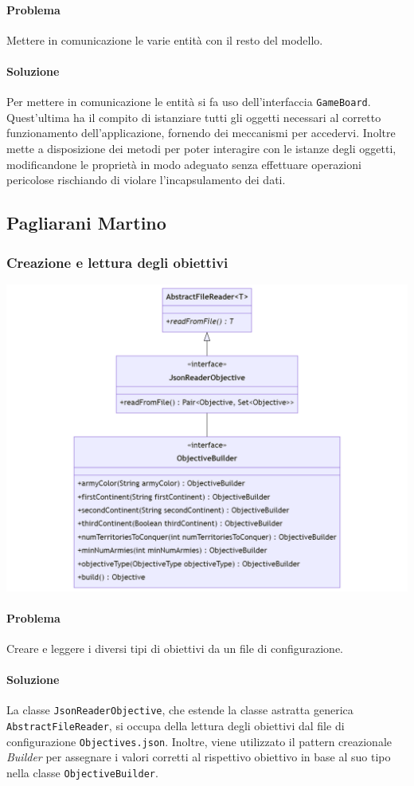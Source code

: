 \documentclass[a4paper,12pt]{report}
\begin{document}
\paragraph{Problema} Mettere in comunicazione le varie entit\`a con il resto del modello.
%
\paragraph{Soluzione} Per mettere in comunicazione le entit\`a si fa uso dell'interfaccia \texttt{GameBoard}. Quest'ultima ha il compito di istanziare tutti gli oggetti necessari al corretto funzionamento dell'applicazione, fornendo dei meccanismi per accedervi. Inoltre mette a disposizione dei metodi per poter interagire con le istanze degli oggetti, modificandone le propriet\`a in modo adeguato senza effettuare operazioni pericolose rischiando di violare l'incapsulamento dei dati.
%
\subsection{Pagliarani Martino}
%
\subsubsection{Creazione e lettura degli obiettivi}
%
\includegraphics[width=\textwidth]{img/ReadObjective.png}
%
\paragraph*{Problema}
Creare e leggere i diversi tipi di obiettivi da un file di configurazione.
%
\paragraph*{Soluzione}
La classe \texttt{JsonReaderObjective}, che estende la classe astratta generica \texttt{AbstractFileReader}, si occupa della lettura degli obiettivi dal file di configurazione \texttt{Objectives.json}. Inoltre, viene utilizzato il pattern creazionale \textit{Builder} per assegnare i valori corretti al rispettivo obiettivo in base al suo tipo nella classe \texttt{ObjectiveBuilder}.
%
\end{document}
